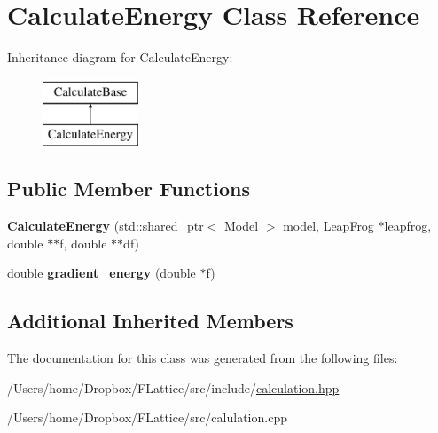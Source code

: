 \hypertarget{class_calculate_energy}{}\section{Calculate\+Energy Class Reference}
\label{class_calculate_energy}
Inheritance diagram for Calculate\+Energy\+:\begin{figure}[H]
\begin{center}
\leavevmode
\includegraphics[height=2.000000cm]{class_calculate_energy}
\end{center}
\end{figure}
\subsection*{Public Member Functions}
\begin{DoxyCompactItemize}
\item 
\mbox{\label{class_calculate_energy_a25aeab3fd4505ccbef0bdc064961785a}} 
{\bfseries Calculate\+Energy} (std\+::shared\+\_\+ptr$<$ \mbox{\hyperlink{class_model}{Model}} $>$ model, \mbox{\hyperlink{class_leap_frog}{Leap\+Frog}} $\ast$leapfrog, double $\ast$$\ast$f, double $\ast$$\ast$df)
\item 
\mbox{\label{class_calculate_energy_ab0c1f1084c68e9c282e49df8ffb31a7c}} 
double {\bfseries gradient\+\_\+energy} (double $\ast$f)
\end{DoxyCompactItemize}
\subsection*{Additional Inherited Members}


The documentation for this class was generated from the following files\+:\begin{DoxyCompactItemize}
\item 
/\+Users/home/\+Dropbox/\+F\+Lattice/src/include/\mbox{\hyperlink{calculation_8hpp}{calculation.\+hpp}}\item 
/\+Users/home/\+Dropbox/\+F\+Lattice/src/calulation.\+cpp\end{DoxyCompactItemize}
